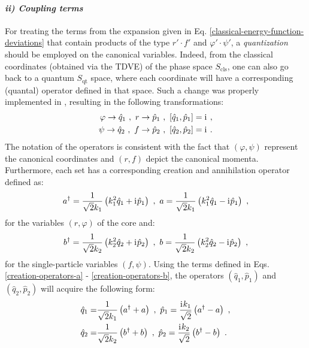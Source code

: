 \paragraph*{\textit{ii) Coupling terms}}
For treating the terms from the expansion given in Eq. \ref{classical-energy-function-deviations} that contain products of the type $r'\cdot f'$ and $\varphi'\cdot \psi'$, a \emph{quantization} should be employed on the canonical variables. Indeed, from the classical coordinates (obtained via the TDVE) of the phase space $S_\text{cls}$, one can also go back to a quantum $S_\text{qt}$ space, where each coordinate will have a corresponding (quantal) operator defined in that space. Such a change was properly implemented in \cite{raduta2020approach}, resulting in the following transformations:
\begin{align}
    \varphi\to\hat{q}_1\ ,\ r\to\hat{p}_1\ ,\ \left[\hat{q}_1,\hat{p}_1\right]&=\iu\ ,\nonumber\\
    \psi\to\hat{q}_2\ ,\ f\to\hat{p}_2\ ,\ \left[\hat{q}_2,\hat{p}_2\right]&=\iu\ .
    \label{canonical-coordinates-quantized}
\end{align}
The notation of the operators is consistent with the fact that $(\varphi,\psi)$ represent the canonical coordinates and $(r,f)$ depict the canonical momenta. Furthermore, each set has a corresponding creation and annihilation operator defined as:
\begin{align}
    a^\dagger=\frac{1}{\sqrt{2}k_1}\left(k_1^2\hat{q}_1+ \mathrm{i}\mkern1mu \hat{p}_1\right)\ ,\ a=\frac{1}{\sqrt{2}k_1}\left(k_1^2\hat{q}_1 - \mathrm{i}\mkern1mu \hat{p}_1\right)\ ,
    \label{creation-operators-a}
\end{align}
for the variables $(r,\varphi)$ of the core and:
\begin{align}
    b^\dagger=\frac{1}{\sqrt{2}k_2}\left(k_2^2\hat{q}_2+ \mathrm{i}\mkern1mu \hat{p}_2\right)\ ,\ b=\frac{1}{\sqrt{2}k_2}\left(k_2^2\hat{q}_2 - \mathrm{i}\mkern1mu \hat{p}_2\right)\ ,
    \label{creation-operators-b}
\end{align}
for the single-particle variables $(f,\psi)$. Using the terms defined in Eqs. \ref{creation-operators-a} - \ref{creation-operators-b}, the operators $(\hat{q}_1,\hat{p}_1)$ and $(\hat{q}_2,\hat{p}_2)$ will acquire the following form:
\begin{align}
    \hat{q}_1=&\frac{1}{\sqrt{2}k_1}\left(a^\dagger+a\right)\ ,\ \hat{p}_1=\frac{\iu k_1}{\sqrt{2}}\left(a^\dagger-a\right)\ ,\nonumber\\
    \hat{q}_2=&\frac{1}{\sqrt{2}k_2}\left(b^\dagger+b\right)\ ,\ \hat{p}_2=\frac{\iu k_2}{\sqrt{2}}\left(b^\dagger-b\right)\ .
    \label{canonical-transformations-ab-qp}
\end{align}

